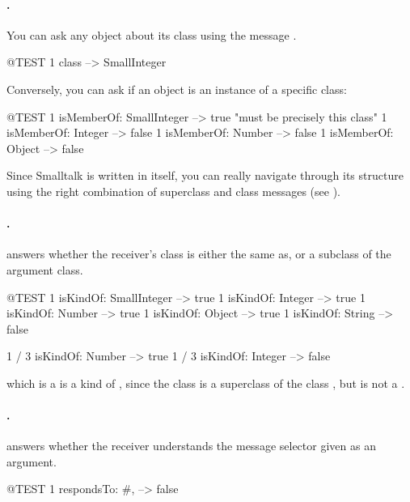 \documentclass[a4paper,10pt,twoside]{book}
\begin{document}
\paragraph{.}
You can ask any object about its class using the message .
\begin{code}{@TEST}
1 class --> SmallInteger
\end{code}

Conversely, you can ask if an object is an instance of a specific class:
\begin{code}{@TEST}
1 isMemberOf: SmallInteger --> true    "must be precisely this class"
1 isMemberOf: Integer          --> false
1 isMemberOf: Number        --> false
1 isMemberOf: Object           --> false
\end{code}

Since Smalltalk is written in itself, you can really navigate through its structure using the right combination of superclass and class messages (see ).

\paragraph{.}
 answers whether the receiver's class is either the same as, or a subclass of the argument class.

\begin{code}{@TEST}
1 isKindOf: SmallInteger --> true
1 isKindOf: Integer          --> true
1 isKindOf: Number         --> true
1 isKindOf: Object           --> true
1 isKindOf: String            --> false

1 / 3 isKindOf: Number      --> true
1 / 3 isKindOf: Integer        --> false
\end{code}

 which is a  is a kind of , since the class  is a superclass of the class , but  is not a .

\paragraph{.}
 answers whether the receiver understands the message selector given as an argument.

\begin{code}{@TEST}
1 respondsTo: #, --> false
\end{code}
\end{document}
